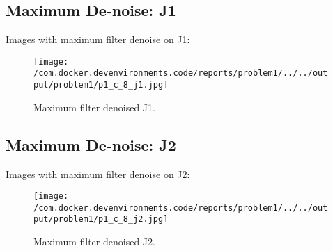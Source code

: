 \documentclass{article}%
\begin{document}
%
\newpage%
\subsection{Maximum De{-}noise: J1}%
\label{subsec:MaximumDe{-}noiseJ1}%
Images with maximum filter denoise on J1:%


\begin{figure}[h!]%
\centering%
\texttt{[image: /com.docker.devenvironments.code/reports/problem1/../../output/problem1/p1\_c\_8\_j1.jpg]}%
\caption{Maximum filter denoised J1.}%
\end{figure}

%
\subsection{Maximum De{-}noise: J2}%
\label{subsec:MaximumDe{-}noiseJ2}%
Images with maximum filter denoise on J2:%


\begin{figure}[h!]%
\centering%
\texttt{[image: /com.docker.devenvironments.code/reports/problem1/../../output/problem1/p1\_c\_8\_j2.jpg]}%
\caption{Maximum filter denoised J2.}%
\end{figure}

%
\end{document}
